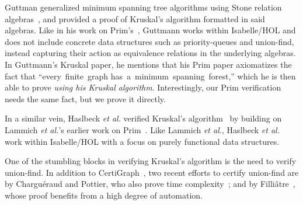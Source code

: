 Guttman generalized minimum spanning tree algorithms using Stone relation algebras~\cite{DBLP:journals/jlp/Guttmann18}, and provided a proof of Kruskal's algorithm formatted in said algebras.  Like in his work on Prim's~\cite{DBLP:conf/ictac/Guttmann16}, Guttmann works within Isabelle/HOL and does not include concrete data structures such as priority-queues and union-find, instead capturing their action as equivalence relations in the underlying algebras. In Guttmann's Kruskal paper, he mentions that his Prim paper axiomatizes the fact that ``every~finite~graph has~a~minimum~spanning~forest,'' which he is then able to prove \emph{using his Kruskal algorithm}.  Interestingly, our Prim verification needs the same fact, but we prove it directly. %

In a similar vein, Haslbeck \emph{et al.} verified Kruskal's algorithm~\cite{DBLP:journals/afp/HaslbeckLB19} by building on Lammich \emph{et al.}'s earlier work on Prim~\cite{DBLP:journals/afp/LammichN19}.  Like Lammich \emph{et al.}, Haslbeck \emph{et al.} work within Isabelle/HOL with a focus on purely functional data structures.

One of the stumbling blocks in verifying Kruskal's algorithm is the need to verify union-find.  In addition to CertiGraph~\cite{DBLP:journals/pacmpl/WangCMH19}, two recent efforts to certify union-find are by Chargu{\'{e}}raud and Pottier, who also prove time complexity~\cite{charpott19}; and by Filli\^atre~\cite{FILLIATRE2021100645}, whose proof benefits from a high degree of automation.




